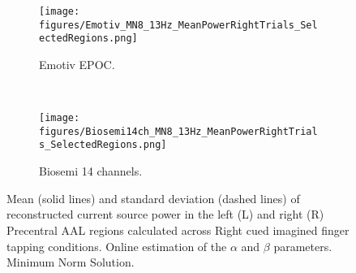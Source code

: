 \documentclass[10pt]{article}
\begin{document}
\begin{figure}
        \centering
        \begin{subfigure}[b]{0.8\columnwidth}
                \centering
        		\texttt{[image: figures/Emotiv\_MN8\_13Hz\_MeanPowerRightTrials\_SelectedRegions.png]}
				\caption{Emotiv EPOC.}
				\label{figure_Emotiv_PowerInPrecentralAALregions}
        \end{subfigure}

        ~ \begin{subfigure}[b]{0.8\columnwidth}
                \centering
               \texttt{[image: figures/Biosemi14ch\_MN8\_13Hz\_MeanPowerRightTrials\_SelectedRegions.png]}
\caption{Biosemi 14 channels. }
\label{figure_Biosemi14ch_PowerInPrecentralAALregions}
        \end{subfigure}
     \caption{Mean (solid lines) and standard deviation (dashed lines) of reconstructed current source power in the left (L) and right (R) Precentral AAL regions calculated across Right cued imagined finger tapping conditions. Online estimation of the $\alpha$ and $\beta$ parameters. Minimum Norm Solution.}
\end{figure}

\iffalse{
\begin{figure}[!t]
\centering
\texttt{[image: figures/Emotiv\_3Dsourcerecon\_Trial190Left\_6timepoints.png]}
\caption{Emotiv EPOC. Reconstructed alpha (8-13 Hz) source power obtained using the MN method at different time points after a left imagined finger tapping cue (0 ms).}
\label{figure_Emotiv_3Dsourcerecon_Trial190Left_6timepoints}
\end{figure}
}\fi


\iffalse{
\begin{figure}[!t]
\centering
\subfloat[Emotiv EPOC]{\label{figure_Emotiv_PowerInPrecentralAALregions}\texttt{[image: figures/Emotiv\_MN8\_13Hz\_MeanPowerRightTrials\_SelectedRegions.png]}}
\subfloat[Biosemi - 14 channels]{\label{figure_Biosemi14ch_PowerInPrecentralAALregions}\texttt{[image: figures/Biosemi\_MN8\_13Hz\_MeanPowerRightTrials\_SelectedRegions.png]}}
\caption{Mean and standard derivation of reconstructed current source power in the left (L) and right (R) Precentral AAL regions calculated across Right cued imagined fingertapping conditions. Online estimation of the $\alpha$ and $\beta$ parameters. Minimum Norm Solution.}
\label{figure_PowerInPrecentralAALregions}
\end{figure}
}\fi
\end{document}
